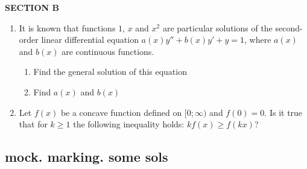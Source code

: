\documentclass[12pt]{article} %
\theoremstyle{definition} %
\begin{document}
\textbf{SECTION B}

\begin{enumerate}[resume]

\item It is known that functions $1$, $x$ and $x^2$  are particular solutions of the second-order linear differential equation  $a(x)y''+b(x)y'+y=1$,  where $a(x)$  and $b(x)$  are continuous functions.
\begin{enumerate}
\item  Find the general solution of this equation
\item  Find $a(x)$ and  $b(x)$
\end{enumerate}
\item Let $f(x)$ be a concave function defined on $[0;\infty)$  and $f(0)=0$. Is it true that for $k \geq 1$ the following inequality holds: $kf(x)\geq f(kx)$?


\end{enumerate}


\subsection{mock. marking. some sols}
\end{document}
